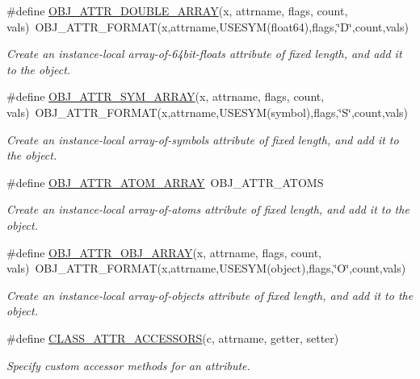 \begin{DoxyCompactItemize}
\#define \hyperlink{group__attr_gaf4b7b36b328fb55c890699b82d3e6c1a}{OBJ\_\-ATTR\_\-DOUBLE\_\-ARRAY}(x, attrname, flags, count, vals)~OBJ\_\-ATTR\_\-FORMAT(x,attrname,USESYM(float64),flags,\char`\"{}D\char`\"{},count,vals)
\begin{DoxyCompactList}\small\item\em Create an instance-\/local array-\/of-\/64bit-\/floats attribute of fixed length, and add it to the object. \item\end{DoxyCompactList}\item 
\#define \hyperlink{group__attr_ga70a7471a5da2c8ba7fff3d9b2f7ec72c}{OBJ\_\-ATTR\_\-SYM\_\-ARRAY}(x, attrname, flags, count, vals)~OBJ\_\-ATTR\_\-FORMAT(x,attrname,USESYM(symbol),flags,\char`\"{}S\char`\"{},count,vals)
\begin{DoxyCompactList}\small\item\em Create an instance-\/local array-\/of-\/symbols attribute of fixed length, and add it to the object. \item\end{DoxyCompactList}\item 
\#define \hyperlink{group__attr_ga63912314a2787b9e05d3c4f9915f567f}{OBJ\_\-ATTR\_\-ATOM\_\-ARRAY}~OBJ\_\-ATTR\_\-ATOMS
\begin{DoxyCompactList}\small\item\em Create an instance-\/local array-\/of-\/atoms attribute of fixed length, and add it to the object. \item\end{DoxyCompactList}\item 
\#define \hyperlink{group__attr_ga41c69e626a725fddc6798eedbb24fafd}{OBJ\_\-ATTR\_\-OBJ\_\-ARRAY}(x, attrname, flags, count, vals)~OBJ\_\-ATTR\_\-FORMAT(x,attrname,USESYM(object),flags,\char`\"{}O\char`\"{},count,vals)
\begin{DoxyCompactList}\small\item\em Create an instance-\/local array-\/of-\/objects attribute of fixed length, and add it to the object. \item\end{DoxyCompactList}\item 
\#define \hyperlink{group__attr_ga51b1e8466f45d86683437a77be600fb8}{CLASS\_\-ATTR\_\-ACCESSORS}(c, attrname, getter, setter)
\begin{DoxyCompactList}\small\item\em Specify custom accessor methods for an attribute. \item\end{DoxyCompactList}\item 

\end{DoxyCompactItemize}
